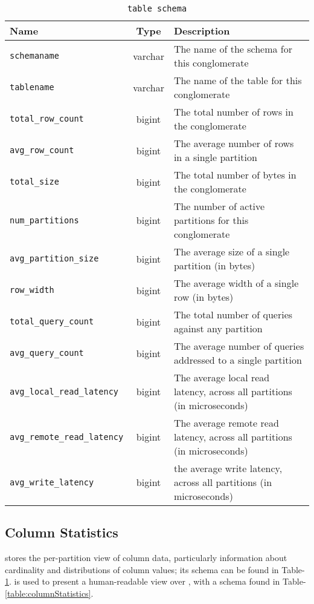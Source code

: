 \begin{table}
	\begin{tabular}{|l|c|p{6cm}|}
		\hline
		\bf{Name}											&	\bf{Type}	& \bf{Description} \\ \hline
		\texttt{schemaname}						&	varchar		&	The name of the schema for this conglomerate \\ \hline
		\texttt{tablename}						&	varchar		&	The name of the table for this conglomerate \\ \hline
		\texttt{total\_row\_count}		&	bigint		&	The total number of rows in the conglomerate \\ \hline
		\texttt{avg\_row\_count}			&	bigint		&	The average number of rows in a single partition \\ \hline
		\texttt{total\_size}					&	bigint		&	The total number of bytes in the conglomerate \\ \hline
		\texttt{num\_partitions}			&	bigint		&	The number of active partitions for this conglomerate \\ \hline
		\texttt{avg\_partition\_size}	&	bigint		&	The average size of a single partition (in bytes) \\ \hline
		\texttt{row\_width}						&	bigint		&	The average width of a single row (in bytes) \\ \hline
		\texttt{total\_query\_count}	&	bigint		&	The total number of queries against any partition \\ \hline
		\texttt{avg\_query\_count}		& bigint		&	The average number of queries addressed to a single partition \\ \hline
		\texttt{avg\_local\_read\_latency}	&	bigint	&	The average local read latency, across all partitions (in microseconds) \\ \hline
		\texttt{avg\_remote\_read\_latency}	&	bigint	&	The average remote read latency, across all partitions (in microseconds) \\ \hline
		\texttt{avg\_write\_latency} 				&	bigint	&	the average write latency, across all partitions (in microseconds) \\ \hline
	\end{tabular}
\caption{\systablestatistics \texttt{table schema}}
\label{table:columnStats}
\end{table}

\subsection{Column Statistics}
\syscolumnstats stores the per-partition view of column data, particularly information about cardinality and distributions of column values; its schema can be found in Table-\ref{table:columnStats}. \syscolumnstatistics is used to present a human-readable view over \syscolumnstats, with a schema found in Table-\ref{table:columnStatistics}. 

